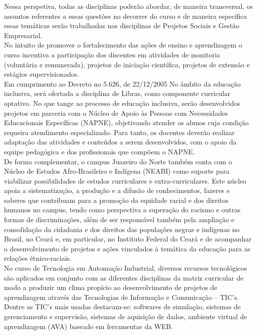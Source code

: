 Nessa perspetiva, todas as disciplinas poderão abordar, de maneira transversal, os assuntos referentes a essas questões no decorrer do curso e de maneira específica essas temáticas serão trabalhadas nas disciplinas de  Projetos Sociais e Gestão Empresarial.\\

No intuito de promover o fortalecimento das ações de ensino e aprendizagem o curso incentiva a participação dos discentes em atividades de monitoria (voluntária e remunerada), projetos de iniciação científica, projetos de extensão e estágios supervisionados.\\

Em cumprimento ao Decreto no 5.626, de 22/12/2005 No âmbito da educação inclusiva, será ofertada a disciplina de Libras, como componente curricular optativo. No que tange ao processo de educação inclusiva, serão desenvolvidos projetos em parceria com o Núcleo de Apoio às Pessoas com Necessidades Educacionais Específicas (NAPNE), objetivando atender os alunos cuja condição requeira atendimento especializado. Para tanto, os docentes deverão realizar adaptação das atividades e conteúdos a serem desenvolvidos, com o apoio da equipe pedagógica e dos profissionais que compõem o NAPNE.\\

De forma complementar, o campus Juazeiro do Norte também conta com o Núcleo de  Estudos Afro-Brasileiro e Indígena (NEABI) como suporte para viabilizar  possibilidades de estudos curriculares e extra-curriculares. Este núcleo apoia a sistematização, a produção e a difusão de conhecimentos, fazeres e saberes que  contribuam para a promoção da equidade racial e dos direitos humanos no campus, tendo como perspectiva a superação do racismo e outras formas de discriminações, além de ser responsável também pela ampliação e consolidação da cidadania e dos   direitos das populações negras e indígenas no Brasil, no Ceará e, em particular, no Instituto Federal do Ceará  e de acompanhar o desenvolvimento de projetos e ações vinculados à temática da educação para as relações étnico-raciais.\\


No curso de Tecnologia em Automação Industrial, diversos recursos tecnológicos são aplicados em conjunto com as diferentes disciplinas da matriz curricular de modo a produzir um clima propício ao desenvolvimento de projetos de aprendizagem através das Tecnologias de Informação e Comunicação – TIC’s. Dentre as TIC’s mais usadas destacam-se: softwares de simulação, sistemas de gerenciamento e supervisão, sistemas de aquisição de dados, ambiente virtual de aprendizagem (AVA) baseado em ferramentas da WEB.\\

